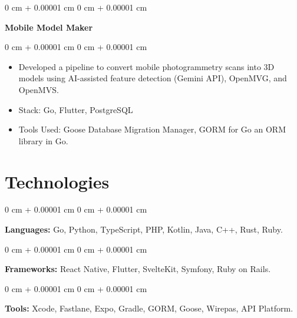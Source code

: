 \documentclass[10pt, letterpaper]{article}
\newenvironment{highlights}{
    \begin{itemize}[
        topsep=0.10 cm,
        parsep=0.10 cm,
        partopsep=0pt,
        itemsep=0pt,
        leftmargin=0 cm + 10pt
    ]
}{
    \end{itemize}
} %
\newenvironment{onecolentry}{
    \begin{adjustwidth}{
        0 cm + 0.00001 cm
    }{
        0 cm + 0.00001 cm
    }
}{
    \end{adjustwidth}
} %
\newenvironment{twocolentry}[2][]{
    \onecolentry
    \def\secondColumn{#2}
    \setcolumnwidth{\fill, 4.5 cm}
    \begin{paracol}{2}
}{
    \switchcolumn \raggedleft \secondColumn
    \end{paracol}
    \endonecolentry
} %
\begin{document}
        \vspace{0.2 cm}

        \begin{twocolentry}{}
            \textbf{Mobile Model Maker}\end{twocolentry}

        \vspace{0.10 cm}
        \begin{onecolentry}
            \begin{highlights}
                \item Developed a pipeline to convert mobile photogrammetry scans into 3D models using AI-assisted feature detection (Gemini API), OpenMVG, and OpenMVS.
                \item Stack: Go, Flutter, PostgreSQL
                \item Tools Used: Goose Database Migration Manager, GORM for Go an ORM library in Go.
            \end{highlights}
        \end{onecolentry}


    
    \section{Technologies}
        
        \begin{onecolentry}
            \textbf{Languages:} Go, Python, TypeScript, PHP, Kotlin, Java, C++, Rust, Ruby.
        \end{onecolentry}


        \begin{onecolentry}
            \textbf{Frameworks:} React Native, Flutter, SvelteKit, Symfony, Ruby on Rails.
        \end{onecolentry}


        \begin{onecolentry}
            \textbf{Tools:} Xcode, Fastlane, Expo, Gradle, GORM, Goose, Wirepas, API Platform.
        \end{onecolentry}
\end{document}
